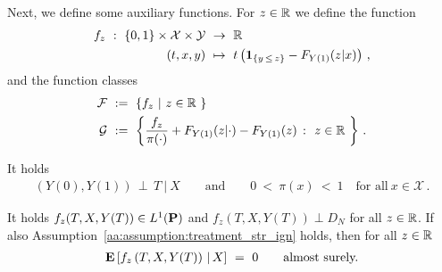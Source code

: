 %

Next, we define some auxiliary functions.
  For $z\in\R$ we define the function
  \begin{align*}
    f_z
    \ 
    :
    \ 
      \left\{ 0,1 \right\}
      \times
      \mathcal{X}
      \times
      \mathcal{Y}
    &
    \ 
    \to
    \ 
    \R
    \\
      (t,x,y)
    &
      \ 
      \mapsto
      \ 
      t
      \left( 
        \mathbf{1}
        _{\left\{  y\,\le\,z \right\}}
        -
        F_{Y(1)}(z|x)
      \right)
      \,,
  \end{align*}
  and the function classes
  \begin{gather}
    \label{F_g}
    \begin{split}
    \mathcal{F}
    &
    \ 
    :=
    \ 
    \left\{ 
      f_z
      \ 
      |
      \ 
      z\in\R\ 
    \right\}
    \\
    \mathcal{G}
    &
    \ 
    :=
    \ 
    \left\{ 
      \frac{f_z}{\pi(\cdot)}
      +
      F_{Y(1)}(z|\cdot)
      -
      F_{Y(1)}(z)
      \ 
      \colon
      \ 
      z\in\R\ 
    \right\}
    \,.
    \end{split}
  \end{gather}
  \begin{assumption}
    \label{aa:assumption:treatment_str_ign}
    It holds 
    \begin{gather*}
    (Y(0),Y(1))\, \perp\,  T \ |\  X
    \qquad
    \text{and}
    \qquad
      0
      \ 
      <
      \ 
      \pi(x)
      \ 
      <
      \ 
      1
      \quad
      \text{for all}\ 
      x\in\mathcal{X}
      \,.
    \end{gather*}
  \end{assumption}
  \begin{lemma}
    \label{aa:mean:r3:lem:fz_E}
    It holds
    $f_z(T,X,Y(T))\in L^1(\P)$
    and 
    $f_z(T,X,Y(T))\perp D_N$
    for all $z\in\R$.
    If also Assumption~\ref{aa:assumption:treatment_str_ign} holds,
    then 
    for all $z\in\R$
    \begin{gather*}
      \E
      \left[
        f_z
        \left( 
          T,
          X,
          Y(T)
        \right)
        \,
        |
        \,
        X
      \right]
      \ 
      =
      \ 
      0
      \qquad
      \text{almost surely.}
    \end{gather*}
  \end{lemma}
